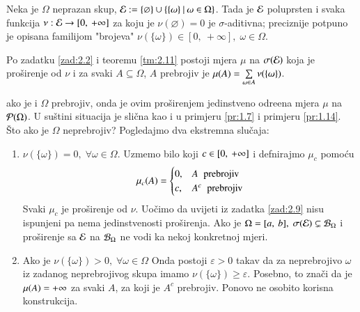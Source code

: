 \begin{nap} \label{nap:2.12}
    Neka je $\Omega$ neprazan skup, $\mathcal{E} := \{\varnothing\} \cup \{{\{ \omega \}} \: | \: {\omega \in \Omega}\}$.
    Tada je $\mathcal{E}$ poluprsten i svaka funkcija $\nu: \mathcal{E} \to [0, \: +\infty]$ za koju je $\nu(\varnothing) = 0$ je $\sigma$-aditivna;
    preciznije potpuno je opisana familijom "brojeva" $\nu(\{ \omega \}) \in [0, \: +\infty], \; \omega \in \Omega$.

    Po zadatku \ref{zad:2.2} i teoremu \ref{tm:2.11} postoji mjera $\mu$ na $\sigma({\mathcal{E}})$ koja je pro\v sirenje od $\nu$ i za svaki $A \subseteq \Omega$, $A$ prebrojiv je $\mu({A}) = \sum\limits_{\omega \in A}^{} \nu(\{ \omega \})$.

    ako je i $\Omega$ prebrojiv, onda je ovim pro\v sirenjem jedinstveno odre\dj ena mjera $\mu$ na $\mathcal{P}({\Omega})$.
    U su\v stini situacija je sli\v cna kao i u primjeru \ref{pr:1.7} i primjeru \ref{pr:1.14}.
    \v Sto ako je $\Omega$ neprebrojiv?
    Pogledajmo dva ekstremna slu\v caja:
    \begin{enumerate}[label=(\roman*)]
        \item $\nu(\{ \omega \}) = 0, \; \forall \omega \in \Omega$.
        Uzmemo bilo koji $c \in [{0}, \:{+\infty}]$ i defnirajmo $\mu_c$ pomo\' cu
        \begin{equation*}
            \mu_c(A) = 
            \begin{cases}
                0, &A \;\; \textnormal{prebrojiv}\\
                c, &A^c \;\; \textnormal{prebrojiv}
            \end{cases}
        \end{equation*}
        Svaki $\mu_c$ je pro\v sirenje od $\nu$.
        Uo\v cimo da uvijeti iz zadatka \ref{zad:2.9} nisu ispunjeni pa nema jedinstvenosti pro\v sirenja.
        Ako je $\Omega = [{a}, \:{b}], \; \sigma({\mathcal{E}}) \subsetneq \mathcal{B}_{\Omega}$ i pro\v sirenje sa $\mathcal{E}$ na $\mathcal{B}_{\Omega}$ ne vodi ka nekoj konkretnoj mjeri.
        \item Ako je $\nu(\{\omega\}) > 0, \; \forall \omega \in \Omega$ Onda postoji $\varepsilon > 0$ takav da za neprebrojivo $\omega$ iz zadanog neprebrojivog skupa imamo $\nu(\{\omega\}) \geq \varepsilon$.
        Posebno, to zna\v ci da je $\mu({A}) = +\infty$ za svaki $A$, za koji je $A^c$ prebrojiv.
        Ponovo ne osobito korisna konstrukcija.
    \end{enumerate}
\end{nap}

